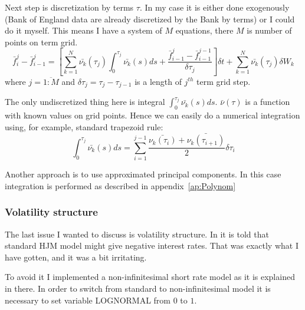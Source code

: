 \documentclass[11pt]{article} %
\begin{document}
Next step is discretization by terms $\tau$. In my case it is either done exogenously (Bank of England data are already discretized by the Bank by terms) or I could do it myself. This means I have a system of $M$ equations, there $M$ is number of points on term grid.
\begin{equation} \label{eq:hjm_musiela_multidim_discrete}
\bar{f}_i^j - \bar{f}_{i-1}^j = \left[\sum_{k=1}^N\bar{\nu_k}(\tau_j)\int_{0}^{\tau_j}\bar{\nu_k}(s)ds+ \frac{\bar{f}_{i-1}^j-\bar{f}_{i-1}^{j-1}}{\delta\tau_j}\right]\delta t + \sum_{k=1}^N\bar{\nu_k}(\tau_j)\delta W_{k}
\end{equation}
where $j = \overline{1:M}$ and $\delta\tau_j = \tau_j - \tau_{j-1}$ is a length of $j^{th}$ term grid step. 

The only undiscretized thing here is integral $\int_{0}^{\tau_j}\bar{\nu_k}(s)ds$. $\bar{\nu}(\tau)$ is a function with known values on grid points. Hence we can easily do a numerical integration using, for example, standard trapezoid rule:
\begin{equation}
\int_{0}^{\tau_j}\bar{\nu_k}(s)ds = \sum_{i=1}^{j-1}\frac{\bar{\nu_k(\tau_i)}+\bar{\nu_k(\tau_{i+1})}}{2}\delta\tau_i
\end{equation}

Another approach is to use approximated principal components. In this case integration is performed as described in appendix~\ref{ap:Polynom}

\subsubsection{Volatility structure}
The last issue I wanted to discuss is volatility structure. In \cite[par. 37.15]{PWoQF06} it is told that standard HJM model might give negative interest rates. That was exactly what I have gotten, and it was a bit irritating. 

To avoid it I implemented a non-infinitesimal short rate model as it is explained in there. In order to switch from standard to non-infinitesimal model it is necessary to set variable LOGNORMAL from $0$ to $1$.
\end{document}
